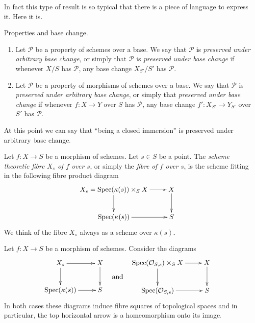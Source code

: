 \noindent
In fact this type of result is so typical that there is a
piece of language to express it. Here it is.

\begin{definition}
\label{definition-preserved-by-base-change}
Properties and base change.
\begin{enumerate}
\item Let $\mathcal{P}$ be a property of schemes over a base.
We say that $\mathcal{P}$ is {\it preserved under arbitrary base change},
or simply that $\mathcal{P}$ is {\it preserved under base change}
if whenever $X/S$
has $\mathcal{P}$, any base change $X_{S'}/S'$ has $\mathcal{P}$.
\item Let $\mathcal{P}$ be a property of morphisms of schemes over a base.
We say that $\mathcal{P}$ is {\it preserved under arbitrary base change},
or simply that {\it preserved under base change} if whenever
$f : X \to Y$ over $S$ has $\mathcal{P}$, any base change
$f' : X_{S'} \to Y_{S'}$ over $S'$ has $\mathcal{P}$.
\end{enumerate}
\end{definition}

\noindent
At this point we can say that ``being a closed immersion'' is
preserved under arbitrary base change.

\begin{definition}
\label{definition-fibre}
Let $f : X \to S$ be a morphism of schemes.
Let $s \in S$ be a point.
The {\it scheme theoretic fibre $X_s$ of $f$ over $s$},
or simply the {\it fibre of $f$ over $s$},
is the scheme fitting in the following fibre product diagram
$$
\xymatrix{
X_s = \Spec(\kappa(s)) \times_S X \ar[r] \ar[d] &
X \ar[d] \\
\Spec(\kappa(s)) \ar[r] &
S
}
$$
We think of the fibre $X_s$ always as a scheme over $\kappa(s)$.
\end{definition}

\begin{lemma}
\label{lemma-fibre-topological}
Let $f : X \to S$ be a morphism of schemes.
Consider the diagrams
$$
\vcenter{
\xymatrix{
X_s \ar[r] \ar[d] & X \ar[d] \\
\Spec(\kappa(s)) \ar[r] & S
}
}
\quad\text{and}\quad
\vcenter{
\xymatrix{
\Spec(\mathcal{O}_{S, s}) \times_S X \ar[r] \ar[d] & X \ar[d] \\
\Spec(\mathcal{O}_{S, s}) \ar[r] & S
}
}
$$
In both cases these diagrams induce fibre squares of topological
spaces and in particular, the top horizontal arrow is a homeomorphism
onto its image.
\end{lemma}

